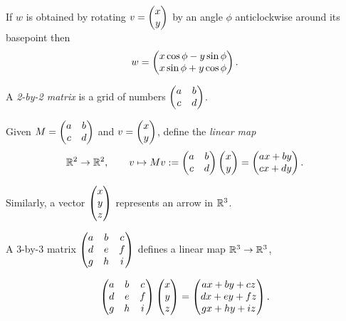 \documentclass{beamer}
\begin{document}
\begin{frame}
\begin{Theorem}
If \(w\) is obtained by rotating \(v=\begin{pmatrix} x \\ y\end{pmatrix}\) by an angle
\(\phi\) anticlockwise around its basepoint then
\[w=\begin{pmatrix} x\cos\phi-y\sin\phi \\ x\sin\phi+y\cos\phi\end{pmatrix}.\]


\end{Theorem}
\begin{Definition}
A {\em 2-by-2 matrix} is a grid of numbers \(\begin{pmatrix} a & b \\ c &
d\end{pmatrix}\).


Given \(M=\begin{pmatrix} a & b \\ c & d\end{pmatrix}\) and \(v=\begin{pmatrix} x \\ y\end{pmatrix}\), define
the {\em linear map} \[\mathbb{R}^2\to\mathbb{R}^2,\qquad v\mapsto Mv:=\begin{pmatrix} a & b
\\ c & d\end{pmatrix}\begin{pmatrix} x \\ y\end{pmatrix}=\begin{pmatrix} ax+by \\ cx+dy\end{pmatrix}.\]


\end{Definition}
\end{frame}
\begin{frame}
Similarly, a vector \(\begin{pmatrix} x \\ y \\ z\end{pmatrix}\) represents an arrow in
\(\mathbb{R}^3\).


A 3-by-3 matrix \(\begin{pmatrix} a & b & c \\ d & e & f \\ g & h & i\end{pmatrix}\)
defines a linear map \(\mathbb{R}^3\to\mathbb{R}^3\),


\[\begin{pmatrix} a & b & c \\ d & e & f \\ g & h & i\end{pmatrix}\begin{pmatrix} x \\ y \\ z\end{pmatrix}=\begin{pmatrix} ax+by+cz \\ dx+ey+fz \\ gx+hy+iz\end{pmatrix}.\]


\end{frame}
\end{document}
